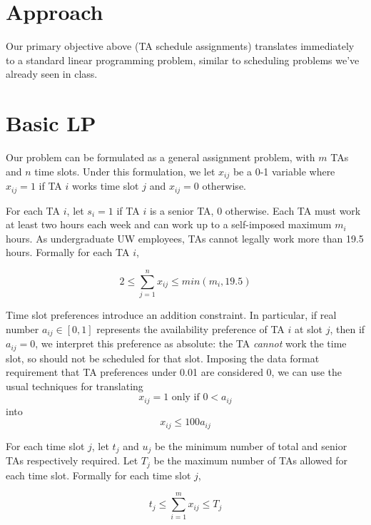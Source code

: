 \documentclass{article}
\begin{document}
\begin{multicols}{2}
\section*{Approach}
Our primary objective above (TA schedule assignments) translates immediately to a standard linear programming problem, similar to scheduling problems we've already seen in class.


\section*{Basic LP}
Our problem can be formulated as a general assignment problem, with $m$ TAs and $n$ time slots. Under this formulation, we let $x_{ij}$ be a 0-1 variable where $x_{ij} = 1$ if TA $i$ works time slot $j$ and $x_{ij} = 0$ otherwise.

For each TA $i$, let $s_i = 1$ if TA $i$ is a senior TA, 0 otherwise. Each TA must work at least two hours each week and can work up to a self-imposed maximum $m_i$ hours. As undergraduate UW employees, TAs cannot legally work more than 19.5 hours. Formally for each TA $i$,

\begin{equation}
2 \leq \sum_{j=1}^{n}x_{ij} \leq min(m_i, 19.5)
\end{equation}

Time slot preferences introduce an addition constraint. In particular, if real number $a_{ij} \in [0,1]$ represents the availability preference of TA $i$ at slot $j$, then if $a_{ij} = 0$, we interpret this preference as absolute: the TA \textit{cannot} work the time slot, so should not be scheduled for that slot. Imposing the data format requirement that TA preferences under 0.01 are considered 0, we can use the usual techniques for translating
\begin{equation}
x_{ij} = 1 \textrm{ only if } 0 < a_{ij}
\end{equation}
into
\begin{equation}
x_{ij} \leq 100 a_{ij}
\end{equation}

For each time slot $j$, let $t_j$ and $u_j$ be the minimum number of total and senior TAs respectively required. Let $T_j$ be the maximum number of TAs allowed for each time slot. Formally for each time slot $j$,

\begin{equation}
t_j \leq \sum_{i=1}^{m}x_{ij} \leq T_j
\end{equation}


\end{multicols}
\end{document}

